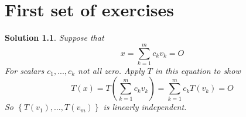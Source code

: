 \documentclass{report}
\newtheorem{solution}{Solution}[chapter]
\begin{document}
\chapter{First set of exercises}
\begin{solution}
    Suppose that 
    \begin{equation}
        x = \sum^{m}_{k=1}{c_k v_k} = O
    \end{equation}
    For scalars $c_1,...,c_k$ not all zero. Apply $T$ in this equation to show
    \begin{equation}
        T(x) = T\left(\sum^{m}_{k=1}{c_k v_k}\right) = \sum^{m}_{k=1}{c_k T(v_k)}=O
    \end{equation}
    So $\left\{T(v_1),\dots,T(v_m)\right\}$ is linearly independent.
\end{solution}
\end{document}
